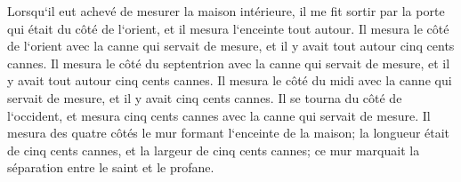 \verse Lorsqu`il eut achevé de mesurer la maison intérieure, il me fit sortir par la porte qui était du côté de l`orient, et il mesura l`enceinte tout autour. 
\verse Il mesura le côté de l`orient avec la canne qui servait de mesure, et il y avait tout autour cinq cents cannes. 
\verse Il mesura le côté du septentrion avec la canne qui servait de mesure, et il y avait tout autour cinq cents cannes. 
\verse Il mesura le côté du midi avec la canne qui servait de mesure, et il y avait cinq cents cannes. 
\verse Il se tourna du côté de l`occident, et mesura cinq cents cannes avec la canne qui servait de mesure. 
\verse Il mesura des quatre côtés le mur formant l`enceinte de la maison; la longueur était de cinq cents cannes, et la largeur de cinq cents cannes; ce mur marquait la séparation entre le saint et le profane. 

\chapter{}

